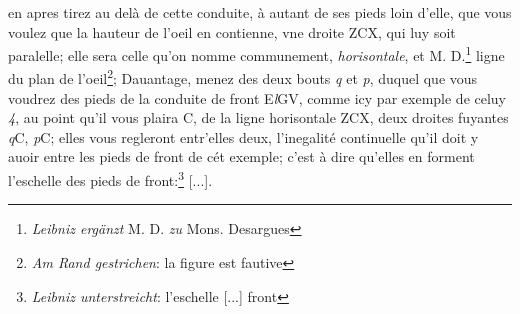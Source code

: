  \pagebreak \pstart [p.~86] [...] en apres tirez au del\`{a} de cette conduite, \`{a} autant de ses pieds loin d'elle, que vous voulez que la hauteur de l'oeil\protect{} en contienne, vne droite ZCX, qui luy soit paralelle; elle sera celle qu'on nomme communement, \textit{horisontale}, et M. D.\footnote{\textit{Leibniz erg\"{a}nzt} M. D. \textit{zu} Mons. Desargues} ligne du plan de l'oeil\protect{}\footnote{\textit{Am Rand gestrichen}: la figure est fautive}; Dauantage, menez des deux bouts \textit{q} et \textit{p}, duquel que vous voudrez des pieds de la conduite de front E\textit{l}GV, comme icy par exemple de celuy \textit{4}, au point qu'il vous plaira C, de la ligne horisontale ZCX, deux droites fuyantes \textit{q}C, \textit{p}C; elles vous regleront entr'elles deux, l'inegalit\'{e} continuelle qu'il doit y auoir entre les pieds de front de c\'{e}t exemple; c'est \`{a} dire qu'elles en forment l'eschelle des pieds de front:\footnote{\textit{Leibniz unterstreicht}: l'eschelle [...] front} [...].\pend